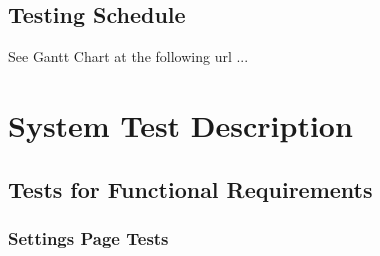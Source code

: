 \documentclass[12pt, titlepage]{article}
\begin{document}
\subsection{Testing Schedule}
		
See Gantt Chart at the following url ...

\section{System Test Description}
	
\subsection{Tests for Functional Requirements}
\subsubsection{Settings Page Tests}
\end{document}
